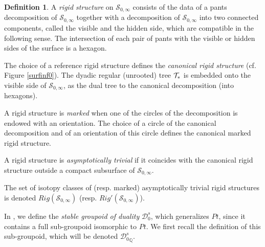 \documentclass[twoside]{irmaems}
\theoremstyle{plain}
\theoremstyle{definition}
\newtheorem{definition}{Definition}[section]
\theoremstyle{remark}
\newcommand{\Q}{{\mathbb{Q}}}
\begin{document}
\begin{definition}
A {\em rigid structure}  on $\mathscr{S}_{0,\infty}$ consists of the data of 
a pants decomposition of  $\mathscr{S}_{0,\infty}$ together with a 
decomposition of  $\mathscr{S}_{0,\infty}$ into two connected components, called the visible and the hidden side, which are compatible in the following sense. 
The intersection of each pair of pants with the visible or hidden sides of the surface is a hexagon.

\vspace{0.1cm}\noindent 
The choice of a reference rigid structure defines the {\em canonical rigid structure}  (cf. Figure \ref{surfinf0}).  
The dyadic regular (unrooted) tree ${\cal T}_{*}$ is embedded onto the visible side of $\mathscr{S}_{0,\infty}$,
 as the dual tree to the canonical decomposition (into hexagons).

\vspace{0.1cm}\noindent 
A rigid structure is {\em marked} when one of the circles of the decomposition 
is endowed with an orientation. The choice of a circle of the canonical 
decomposition and of an orientation of this circle defines the 
canonical marked rigid structure. 



\vspace{0.1cm}\noindent 
A rigid structure is {\em asymptotically trivial}  if it coincides 
with the canonical rigid structure outside a compact subsurface of $\mathscr{S}_{0,\infty}$.

\vspace{0.1cm}\noindent 
The set of isotopy classes of (resp. marked)
asymptotically trivial rigid structures is denoted $Rig(\mathscr{S}_{0,\infty})$ (resp.  $Rig'(\mathscr{S}_{0,\infty})$).
\end{definition}

In  \cite{fu-ka1}, we define the {\it stable groupoid of duality} ${\mathscr{D}}_0^s$,  which generalizes $Pt$, since it
contains a full sub-groupoid isomorphic to $Pt$. We first recall the definition of this sub-groupoid, 
which will be denoted ${{\mathscr{D}}_0^s}_{\Q}$. 
\end{document}
